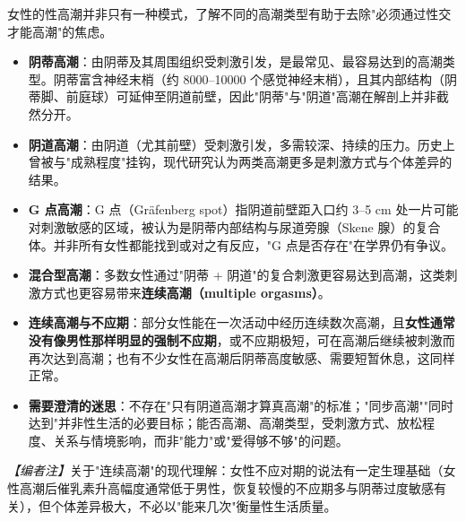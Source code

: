 女性的性高潮并非只有一种模式，了解不同的高潮类型有助于去除"必须通过性交才能高潮"的焦虑。

\begin{itemize}
	\item \textbf{阴蒂高潮}：由阴蒂及其周围组织受刺激引发，是最常见、最容易达到的高潮类型。阴蒂富含神经末梢（约 8000--10000 个感觉神经末梢），且其内部结构（阴蒂脚、前庭球）可延伸至阴道前壁，因此"阴蒂"与"阴道"高潮在解剖上并非截然分开。
	\item \textbf{阴道高潮}：由阴道（尤其前壁）受刺激引发，多需较深、持续的压力。历史上曾被与"成熟程度"挂钩，现代研究认为两类高潮更多是刺激方式与个体差异的结果。
	\item \textbf{G 点高潮}：G 点（Gräfenberg spot）指阴道前壁距入口约 3--5 cm 处一片可能对刺激敏感的区域，被认为是阴蒂内部结构与尿道旁腺（Skene 腺）的复合体。并非所有女性都能找到或对之有反应，"G 点是否存在"在学界仍有争议。
	\item \textbf{混合型高潮}：多数女性通过"阴蒂 + 阴道"的复合刺激更容易达到高潮，这类刺激方式也更容易带来\textbf{连续高潮（multiple orgasms）}。
	\item \textbf{连续高潮与不应期}：部分女性能在一次活动中经历连续数次高潮，且\textbf{女性通常没有像男性那样明显的强制不应期}，或不应期极短，可在高潮后继续被刺激而再次达到高潮；也有不少女性在高潮后阴蒂高度敏感、需要短暂休息，这同样正常。
	\item \textbf{需要澄清的迷思}：不存在"只有阴道高潮才算真高潮"的标准；"同步高潮""同时达到"并非性生活的必要目标；能否高潮、高潮类型，受刺激方式、放松程度、关系与情境影响，而非"能力"或"爱得够不够"的问题。
\end{itemize}

\noindent\textit{【编者注】}关于"连续高潮"的现代理解：女性不应对期的说法有一定生理基础（女性高潮后催乳素升高幅度通常低于男性，恢复较慢的不应期多与阴蒂过度敏感有关），但个体差异极大，不必以"能来几次"衡量性生活质量。
